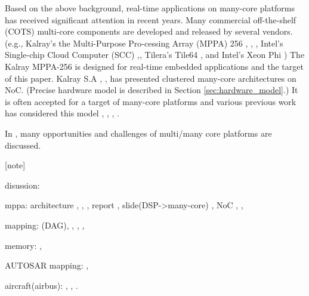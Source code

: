 \documentclass{sig-alternate-05-2015}
\begin{document}
Based on the above background, real-time applications on many-core platforms has received significant attention in recent years.
Many commercial off-the-shelf (COTS) multi-core components are developed and released by several vendors.
(e.g., Kalray's the Multi-Purpose Pro-cessing Array (MPPA) 256 \cite{de2013distributed}, \cite{de2013clustered}, \cite{de2014time},
Intel's Single-chip Cloud Computer (SCC) \cite{intel2015scc},\cite{baron2010single}, Tilera's Tile64 \cite{tilera2015tile64}, and
Intel's Xeon Phi \cite{chrysos2014intel} \cite{chrysos2012intel})
The Kalray MPPA-256 is designed for real-time embedded applications and the target of this paper.
Kalray S.A \cite{de2013distributed}, \cite{de2013clustered}, \cite{de2014time} has presented clustered many-core architectures on NoC.
(Precise hardware model is described in Section \ref{sec:hardware_model}.)
It is often accepted for a target of many-core platforms and various previous work has considered this model \cite{perret2016temporal}, \cite{becker2016contention}, \cite{carle2014static}, \cite{perret2016mapping}.


In \cite{saidi2015shift}, many opportunities and challenges of multi/many core platforms are discussed.

[note]

disussion: \cite{saidi2015shift}

mppa:
  architecture \cite{de2013distributed}, \cite{de2013clustered}, \cite{de2014time},
  report \cite{kanter2015kalray}, 
  slide(DSP->many-core) \cite{de2015kalray},  
  NoC \cite{denet2017work}, \cite{deDinechin2014GSN},

mapping: \cite{perret2016mapping}(DAG), \cite{puffitsch2015off}, \cite{carle2014static}, \cite{becker2014mapping}, \cite{faragardi2014communication}

memory: \cite{perret2016predictable}, \cite{becker2016contention}

AUTOSAR mapping: \cite{becker2016contention}, \cite{faragardi2014communication}

aircraft(airbus): \cite{perret2016temporal}, \cite{perret2016predictable}, \cite{perret2016mapping}. 
\end{document}
